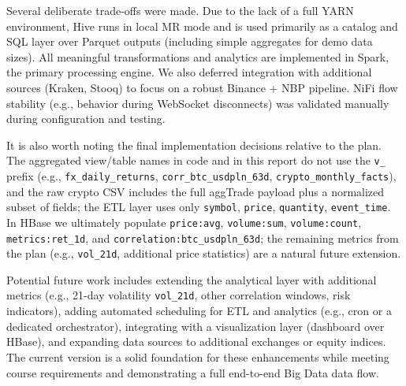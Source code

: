 \documentclass{article}
\begin{document}
Several deliberate trade-offs were made. Due to the lack of a full YARN
environment, Hive runs in local MR mode and is used primarily as a
catalog and SQL layer over Parquet outputs (including simple aggregates
for demo data sizes). All meaningful transformations and analytics are
implemented in Spark, the primary processing engine. We also deferred
integration with additional sources (Kraken, Stooq) to focus on a robust
Binance + NBP pipeline. NiFi flow stability (e.g., behavior during
WebSocket disconnects) was validated manually during configuration and
testing.

It is also worth noting the final implementation decisions relative to
the plan. The aggregated view/table names in code and in this report do
not use the \texttt{v\_} prefix (e.g., \texttt{fx\_daily\_returns},
\texttt{corr\_btc\_usdpln\_63d}, \texttt{crypto\_monthly\_facts}), and the
raw crypto CSV includes the full aggTrade payload plus a normalized
subset of fields; the ETL layer uses only \texttt{symbol},
\texttt{price}, \texttt{quantity}, \texttt{event\_time}. In HBase we
ultimately populate \texttt{price:avg},
\texttt{volume:sum}, \texttt{volume:count}, \texttt{metrics:ret\_1d}, and
\texttt{correlation:btc\_usdpln\_63d}; the remaining metrics from the
plan (e.g., \texttt{vol\_21d}, additional price statistics) are a natural
future extension.

Potential future work includes extending the analytical layer with
additional metrics (e.g., 21-day volatility \texttt{vol\_21d}, other
correlation windows, risk indicators), adding automated scheduling for
ETL and analytics (e.g., cron or a dedicated orchestrator), integrating
with a visualization layer (dashboard over HBase), and expanding data
sources to additional exchanges or equity indices. The current version is
a solid foundation for these enhancements while meeting course
requirements and demonstrating a full end-to-end Big Data data flow.
\end{document}
